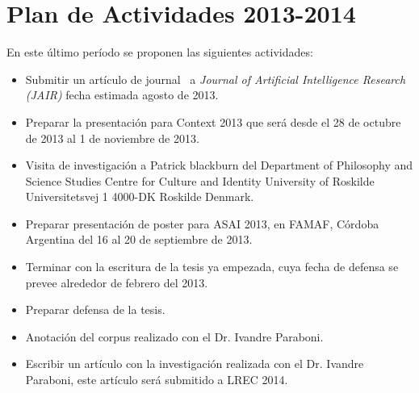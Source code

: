 \section{Plan de Actividades 2013-2014}
\label{plandetrabajo}

En este \'ultimo per\'iodo se proponen las siguientes actividades:

\begin{itemize}

\item Submitir un art\'iculo de journal~\cite{benotti-altamirano-jair} a \emph{Journal of Artificial Intelligence Research (JAIR)} fecha estimada agosto de 2013.
\item Preparar la presentaci\'on para Context 2013 que ser\'a desde el 28 de octubre de 2013 al 1 de noviembre de 2013.
\item Visita de investigaci\'on a Patrick blackburn del Department of Philosophy and Science Studies Centre for Culture and Identity University of Roskilde Universitetsvej 1 4000-DK Roskilde Denmark.
\item Preparar presentaci\'on de poster para ASAI 2013, en FAMAF, C\'ordoba Argentina del 16 al 20 de septiembre de 2013.
\item Terminar con la escritura de la tesis ya empezada, cuya fecha de defensa se prevee alrededor de febrero del 2013.
\item Preparar defensa de la tesis.
\item Anotaci\'on del corpus realizado con el Dr. Ivandre Paraboni.
\item Escribir un art\'iculo con la investigaci\'on realizada con el Dr. Ivandre Paraboni, este art\'iculo ser\'a submitido a LREC 2014.

\end{itemize}

